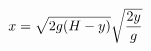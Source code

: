 \documentclass[preview]{standalone}
\begin{document}
\begin{align*}
\special{dvisvgm:raw <g id='unique000'>}x = \sqrt{2 g ( H - y )} \sqrt{\frac{2 y}{g}}\special{dvisvgm:raw </g>}
\end{align*}
\end{document}
